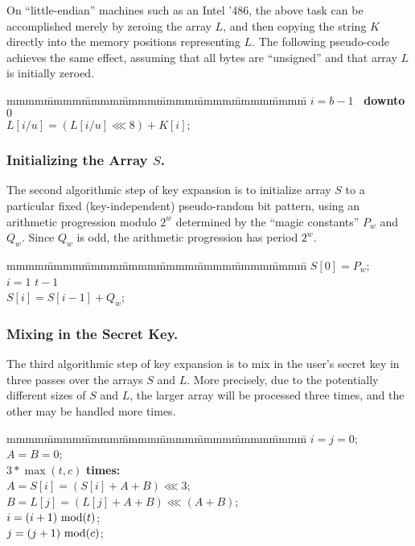 On ``little-endian'' machines such as an Intel '486, the above task
can be accomplished merely by zeroing the array $L$, and then copying
the string $K$ directly into the memory positions representing $L$.
The following pseudo-code achieves the same effect, assuming that all
bytes are ``unsigned'' and that array $L$ is initially zeroed.

\begin{tabbing}
mmmm\=mmmm\=mmmm\=mmmm\=mmmm\=mmmm\=mmmm\=mmmm\=\kill
\>\FOR $i=b-1$ {\bf ~downto~} $0$ \DO \\
\>\>$L[i/u] = (L[i/u] \lll 8) + K[i]$; 
\end{tabbing}

\subsubsection{Initializing the Array $S$.}
The second algorithmic step of key expansion is to initialize array
$S$ to a particular fixed (key-independent) pseudo-random bit pattern,
using an arithmetic progression modulo $2^w$
determined by the ``magic constants'' $P_w$ and $Q_w$.  Since
$Q_w$ is odd, the arithmetic progression has period $2^w$.

\begin{tabbing}
mmmm\=mmmm\=mmmm\=mmmm\=mmmm\=mmmm\=mmmm\=mmmm\=\kill
\>$S[0] = P_w$; \\
\>\FOR $i=1$ \TO $t-1$ \DO \\
\>\>$S[i] = S[i-1] + Q_w$;\\
\end{tabbing}

\newpage
\subsubsection{Mixing in the Secret Key.}  

The third algorithmic step of key expansion is to mix in the user's
secret key in three passes over the arrays $S$ and $L$.  More
precisely, due to the potentially different sizes of $S$ and $L$, the
larger array will be processed three times, and the other may be
handled more times.

\begin{tabbing}
mmmm\=mmmm\=mmmm\=mmmm\=mmmm\=mmmm\=mmmm\=mmmm\=\kill
\>$i = j = 0$;       \\
\>$A = B = 0$;       \\
\>\DO $3*\max(t,c)$ {\bf times:}      \\
\>\>$A = S[i] = (S[i] + A + B) \lll 3$;   \\
\>\>$B = L[j] = (L[j] + A + B) \lll (A+B)$;   \\
\>\>$i = (i + 1) {\rm ~mod}(t)$;          \\
\>\>$j = (j + 1) {\rm ~mod}(c)$;               \\
\end{tabbing}

